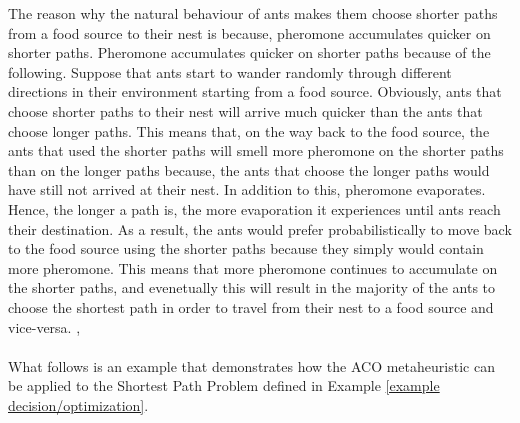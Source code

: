 \documentclass{article}
\begin{document}
The reason why the natural behaviour of ants makes them choose shorter paths from a food source to their nest is because, pheromone accumulates quicker on shorter paths. Pheromone accumulates quicker on shorter paths because of the following. Suppose that ants start to wander randomly through different directions in their environment starting from a food source. Obviously, ants that choose shorter paths to their nest will arrive much quicker than the ants that choose longer paths. This means that, on the way back to the food source, the ants that used the shorter paths will smell more pheromone on the shorter paths than on the longer paths because, the ants that choose the longer paths would have still not arrived at their nest. In addition to this, pheromone evaporates. Hence, the longer a path is, the more evaporation it experiences until ants reach their destination. As a result, the ants would prefer probabilistically to move back to the food source using the shorter paths because they simply would contain more pheromone. This means that more pheromone continues to accumulate on the shorter paths, and evenetually this will result in the majority of the ants to choose the shortest path in order to travel from their nest to a food source and vice-versa. \cite{dorigo_gambardella_1997}, \cite{dorigo_stutzle_thomas_2004}\\\\
What follows is an example that demonstrates how the ACO metaheuristic can be applied to the Shortest Path Problem defined in Example \ref{example decision/optimization}.
\end{document}

